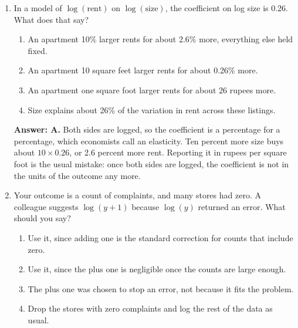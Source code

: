 \documentclass[11pt]{article}
\begin{document}
\begin{enumerate}[itemsep=14pt]
\vspace{2pt}
\textbf{Answer: D.} A line can only go up or down at a constant rate. If the truth curves, the line sits above the data in the middle and below it at the ends, or the reverse, and the residuals trace out the shape the line could not follow. The fixes are a squared term or a log on the predictor.
\vspace{4pt}

\item In a model of $\log(\text{rent})$ on $\log(\text{size})$, the coefficient on log size is 0.26. What does that say?

\begin{enumerate}[label=\Alph*., itemsep=1pt, topsep=3pt]
  \item An apartment 10\% larger rents for about 2.6\% more, everything else held fixed.
  \item An apartment 10 square feet larger rents for about 0.26\% more.
  \item An apartment one square foot larger rents for about 26 rupees more.
  \item Size explains about 26\% of the variation in rent across these listings.
\end{enumerate}

\vspace{2pt}
\textbf{Answer: A.} Both sides are logged, so the coefficient is a percentage for a percentage, which economists call an elasticity. Ten percent more size buys about $10 \times 0.26$, or 2.6 percent more rent. Reporting it in rupees per square foot is the usual mistake: once both sides are logged, the coefficient is not in the units of the outcome any more.
\vspace{4pt}

\item Your outcome is a count of complaints, and many stores had zero. A colleague suggests $\log(y+1)$ because $\log(y)$ returned an error. What should you say?

\begin{enumerate}[label=\Alph*., itemsep=1pt, topsep=3pt]
  \item Use it, since adding one is the standard correction for counts that include zero.
  \item Use it, since the plus one is negligible once the counts are large enough.
  \item The plus one was chosen to stop an error, not because it fits the problem.
  \item Drop the stores with zero complaints and log the rest of the data as usual.
\end{enumerate}


\end{enumerate}
\end{document}
